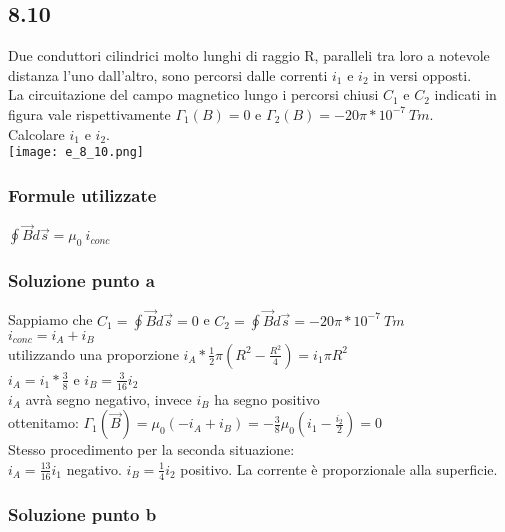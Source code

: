 \documentclass[../../main.tex]{subfiles}
\begin{document}
\subsection*{8.10}
Due conduttori cilindrici molto lunghi di raggio R, paralleli tra loro a notevole distanza l'uno dall'altro, sono percorsi dalle correnti $i_1$ e $i_2$ in versi opposti.\\
La circuitazione del campo magnetico lungo i percorsi chiusi $C_1$ e $C_2$ indicati in figura vale rispettivamente $\Gamma_1(B) = 0$ e $\Gamma_2(B) = -20\pi * 10^{-7}\ Tm$.\\
Calcolare $i_1$ e $i_2$.\\
\texttt{[image: e\_8\_10.png]}
\subsubsection*{Formule utilizzate}
$\oint\vec{B}d\vec{s} = \mu_0\ i_{conc}$
\subsubsection*{Soluzione punto a}
Sappiamo che $C_1 = \oint\vec{B}d\vec{s} = 0$ e $C_2 = \oint\vec{B}d\vec{s} = -20\pi * 10^{-7}\ Tm$\\
$i_{conc} = i_A + i_B$\\
utilizzando una proporzione $i_A * \frac{1}{2}\pi\left(R^2-\frac{R^2}{4}\right) = i_1\pi R^2$ \\
$i_A = i_1* \frac{3}{8}$ e $i_B = \frac{3}{16}i_2$\\
$i_A$ avrà segno negativo, invece $i_B$ ha segno positivo\\
ottenitamo: $\Gamma_1(\vec{B}) = \mu_0\left(-i_A+i_B\right) = -\frac{3}{8}\mu_0\left(i_1-\frac{i_2}{2}\right) = 0$\\
Stesso procedimento per la seconda situazione:\\
$i_A = \frac{13}{16}i_1$ negativo.
$i_B = \frac{1}{4}i_2$ positivo.
La corrente è proporzionale alla superficie.
\subsubsection*{Soluzione punto b}
\newpage
\end{document}
